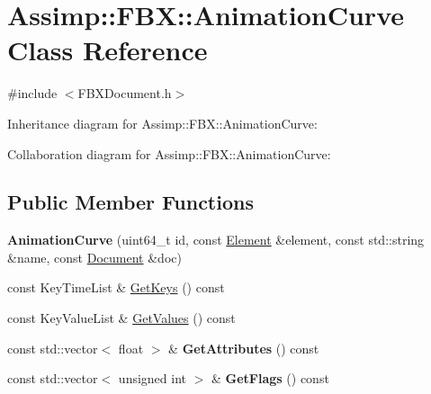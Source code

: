 \hypertarget{class_assimp_1_1_f_b_x_1_1_animation_curve}{\section{Assimp\+:\+:F\+B\+X\+:\+:Animation\+Curve Class Reference}
\label{class_assimp_1_1_f_b_x_1_1_animation_curve}
}


{\ttfamily \#include $<$F\+B\+X\+Document.\+h$>$}



Inheritance diagram for Assimp\+:\+:F\+B\+X\+:\+:Animation\+Curve\+:


Collaboration diagram for Assimp\+:\+:F\+B\+X\+:\+:Animation\+Curve\+:
\subsection*{Public Member Functions}
\begin{DoxyCompactItemize}
\item 
\hypertarget{class_assimp_1_1_f_b_x_1_1_animation_curve_a40a5d68ad18e9d4b03f1d65e8ff4a5bb}{{\bfseries Animation\+Curve} (uint64\+\_\+t id, const \hyperlink{class_assimp_1_1_f_b_x_1_1_element}{Element} \&element, const std\+::string \&name, const \hyperlink{class_assimp_1_1_f_b_x_1_1_document}{Document} \&doc)}\label{class_assimp_1_1_f_b_x_1_1_animation_curve_a40a5d68ad18e9d4b03f1d65e8ff4a5bb}

\item 
const Key\+Time\+List \& \hyperlink{class_assimp_1_1_f_b_x_1_1_animation_curve_aa1a82b3f8d461f8f25168b373a217efb}{Get\+Keys} () const 
\item 
const Key\+Value\+List \& \hyperlink{class_assimp_1_1_f_b_x_1_1_animation_curve_a4950a4f3656423f6c5d23392efa09042}{Get\+Values} () const 
\item 
\hypertarget{class_assimp_1_1_f_b_x_1_1_animation_curve_a68912d681eaa675f3e801b445c3ca7dc}{const std\+::vector$<$ float $>$ \& {\bfseries Get\+Attributes} () const }\label{class_assimp_1_1_f_b_x_1_1_animation_curve_a68912d681eaa675f3e801b445c3ca7dc}

\item 
\hypertarget{class_assimp_1_1_f_b_x_1_1_animation_curve_a19969727b5561fa0767a8d56a26f25f9}{const std\+::vector$<$ unsigned int $>$ \& {\bfseries Get\+Flags} () const }\label{class_assimp_1_1_f_b_x_1_1_animation_curve_a19969727b5561fa0767a8d56a26f25f9}

\end{DoxyCompactItemize}
